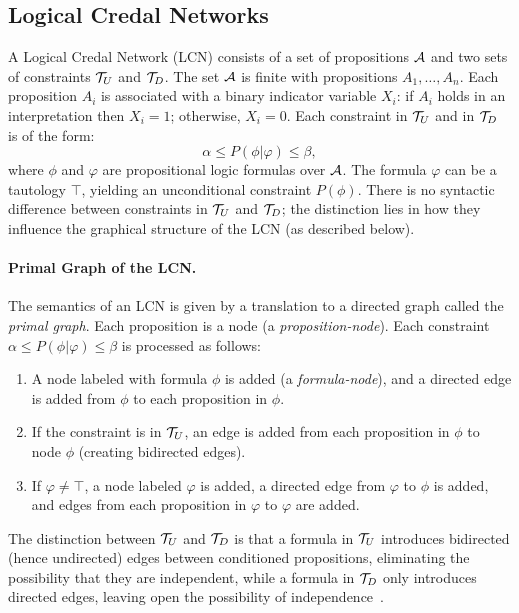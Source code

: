 \documentclass{article}
\begin{document}
\subsection{Logical Credal Networks}

A Logical Credal Network (LCN) consists of a set of propositions $\mathcal{A}$ and two sets of constraints $\mathcal{T}_U$ and $\mathcal{T}_D$. The set $\mathcal{A}$ is finite with propositions $A_1, \dots, A_n$. Each proposition $A_i$ is associated with a binary indicator variable $X_i$: if $A_i$ holds in an interpretation then $X_i=1$; otherwise, $X_i=0$. Each constraint in $\mathcal{T}_U$ and in $\mathcal{T}_D$ is of the form:
\begin{equation}
\alpha \leq P(\phi|\varphi) \leq \beta,
\end{equation}
where $\phi$ and $\varphi$ are propositional logic formulas over $\mathcal{A}$. The formula $\varphi$ can be a tautology $\top$, yielding an unconditional constraint $P(\phi)$. There is no syntactic difference between constraints in $\mathcal{T}_U$ and $\mathcal{T}_D$; the distinction lies in how they influence the graphical structure of the LCN (as described below).

\paragraph{Primal Graph of the LCN.} The semantics of an LCN is given by a translation to a directed graph called the \emph{primal graph}. Each proposition is a node (a \emph{proposition-node}). Each constraint $\alpha \leq P(\phi|\varphi) \leq \beta$ is processed as follows:
\begin{enumerate}
    \item A node labeled with formula $\phi$ is added (a \emph{formula-node}), and a directed edge is added from $\phi$ to each proposition in $\phi$.
    \item If the constraint is in $\mathcal{T}_U$, an edge is added from each proposition in $\phi$ to node $\phi$ (creating bidirected edges).
    \item If $\varphi \neq \top$, a node labeled $\varphi$ is added, a directed edge from $\varphi$ to $\phi$ is added, and edges from each proposition in $\varphi$ to $\varphi$ are added.
\end{enumerate}

The distinction between $\mathcal{T}_U$ and $\mathcal{T}_D$ is that a formula in $\mathcal{T}_U$ introduces bidirected (hence undirected) edges between conditioned propositions, eliminating the possibility that they are independent, while a formula in $\mathcal{T}_D$ only introduces directed edges, leaving open the possibility of independence~\cite{marinescu2022neurips,cozman2024ijar}.
\end{document}
